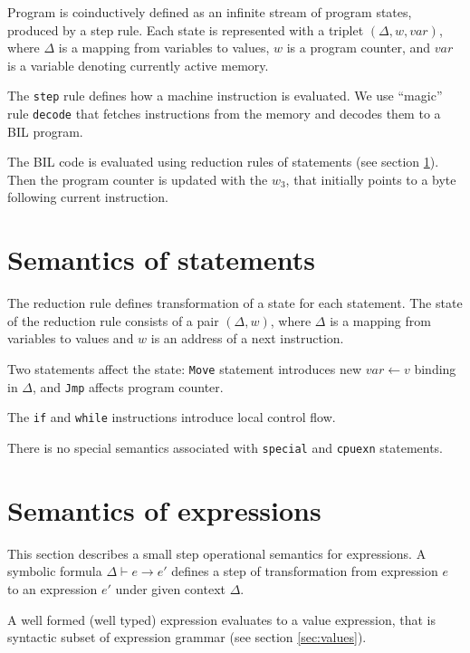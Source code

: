 \documentclass[11pt]{article}
\begin{document}
Program is coinductively defined as an infinite stream of program
states, produced by a step rule. Each state is represented with a
triplet $(\Delta, w, var)$, where $\Delta$ is a mapping from variables
to values, $w$ is a program counter, and $var$ is a variable
denoting currently active memory.

The \verb|step| rule defines how a machine instruction is
evaluated. We use ``magic'' rule \verb|decode| that fetches
instructions from the memory and decodes them to a BIL program.

The BIL code is evaluated using reduction rules of statements (see
section \ref{sec:sema:stmt}). Then the program counter is updated with
the $w_3$, that initially points to a byte following current instruction.

\ottdefnsprogram

\section{Semantics of statements}
\label{sec:sema:stmt}

The reduction rule defines transformation of a state for each
statement. The state of the reduction rule consists of a pair
$(\Delta,w)$, where $\Delta$ is a mapping from variables to values and
$w$ is an address of a next instruction.

Two statements affect the state: \verb|Move| statement introduces new
$var \leftarrow v$ binding in $\Delta$, and \verb|Jmp| affects
program counter.

The \verb|if| and \verb|while| instructions introduce local control
flow.

There is no special semantics associated with \verb|special| and
\verb|cpuexn| statements.

\ottdefnsreduceXXstmt


\section {Semantics of expressions}
\label{sec:sema:exp}

This section describes a small step operational semantics for
expressions. A symbolic formula $\Delta \vdash e \rightarrow e' $
defines a step of transformation from expression $e$ to an expression
$e'$ under given context $\Delta$.

A well formed (well typed) expression evaluates to a value expression,
that is syntactic subset of expression grammar (see
section \ref{sec:values}).
\end{document}
